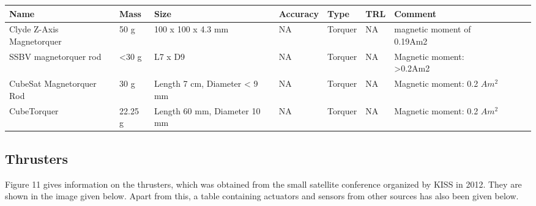 \begin{center}
     \begin{tabular}{ |p{2cm} | p{1cm} | p{2cm} |  p{2cm} | l | p{2cm} | l | p{4cm} | p{1cm} | p{2cm} |  }
     \hline

      {\bf Name} & {\bf Mass} & {\bf Size} & {\bf Accuracy} & {\bf Type} & {\bf TRL} & {\bf Comment}  \\ \hline
      
       Clyde Z-Axis Magnetorquer & 50 g & 100 x 100 x 4.3 mm & NA & Torquer & NA & magnetic moment of 0.19Am2 \\ \hline
       
	   SSBV magnetorquer rod & <30 g & L7 x D9 & NA & Torquer & NA & Magnetic moment: >0.2Am2 \\ \hline
	   
	   CubeSat Magnetorquer Rod \cite{CubeShop} & 30 g & Length 7 cm, Diameter < 9 mm & NA & Torquer & NA & Magnetic moment: 0.2 $Am^2$ \\ \hline
	   
	   CubeTorquer \cite{CubeShop} & 22.25 g & Length 60 mm, Diameter 10 mm & NA & Torquer & NA & Magnetic moment: 0.2 $Am^2$ \\ \hline	 
     \end{tabular}
\end{center}

\subsection{Thrusters}

Figure 11 gives information on the thrusters, which was obtained from the small satellite conference organized by KISS in 2012. They are shown in the image given below.  Apart from this, a table containing actuators and sensors from other sources has also been given below.


